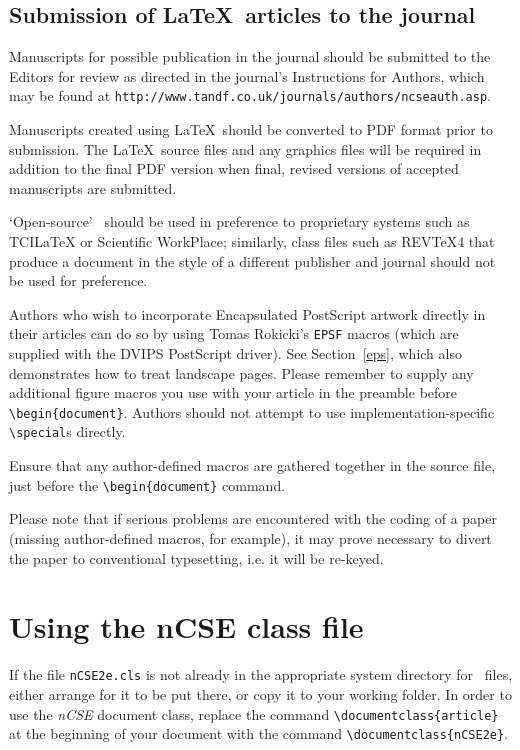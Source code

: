 \documentclass{nCSE2e}
\begin{document}
\subsection{Submission of \LaTeX\ articles to the journal}\label{S1.2}

Manuscripts for possible publication in the journal should be submitted to the Editors for review as directed in the journal's Instructions for Authors, which may be found at {\tt{http://www.tandf.co.uk/journals/authors/ncseauth.asp}}.

Manuscripts created using \LaTeX\ should be converted to PDF format prior to submission. The \LaTeX\ source files and any graphics files will be required in addition to the final PDF version when final, revised versions of accepted manuscripts are submitted.

`Open-source' \LaTeXe\ should be used in preference to proprietary systems such as TCILaTeX or Scientific WorkPlace; similarly, class files such as REVTeX4 that produce a document in the style of a different publisher and journal should not be used for preference.

Authors who wish to incorporate Encapsulated PostScript artwork directly in their articles can do so by using
Tomas Rokicki's {\tt EPSF} macros (which are supplied with the DVIPS PostScript driver). See Section~\ref{eps},
which also demonstrates how to treat landscape pages. Please remember to supply any additional figure macros you
use with your article in the preamble before \verb"\begin{document}". Authors should not attempt to use
implementation-specific \verb"\special"s directly.

Ensure that any author-defined macros are gathered together in the source file, just before the
\verb"\begin{document}" command.

Please note that if serious problems are encountered with the coding of a paper (missing author-defined macros,
for example), it may prove necessary to divert the paper to conventional typesetting, i.e. it will be re-keyed.


\section{Using the {\bi nCSE} class file}

If the file {\tt nCSE2e.cls} is not already in the appropriate system directory for \LaTeXe\ files, either
arrange for it to be put there, or copy it to your working folder. In order to use the {\it nCSE} document class, replace the command
\verb"\documentclass{article}" at the beginning of your document with the command \verb"\documentclass{nCSE2e}".
\end{document}
